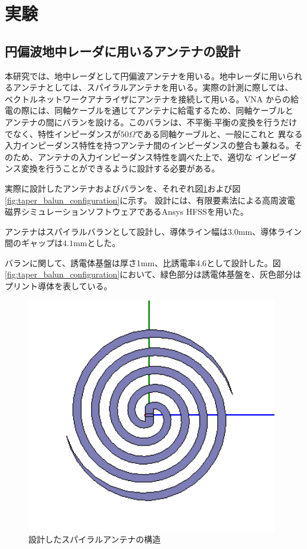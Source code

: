 \documentclass[11pt,a4paper,uplatex,draft]{ujarticle}
\begin{document}
\section{実験}

  \subsection{円偏波地中レーダに用いるアンテナの設計}

  本研究では、地中レーダとして円偏波アンテナを用いる。地中レーダに用いられるアンテナとしては、スパイラルアンテナを用いる。実際の計測に際しては、
  ベクトルネットワークアナライザにアンテナを接続して用いる。VNA からの給電の際には、同軸ケーブルを通じてアンテナに給電するため、同軸ケーブルと
  アンテナの間にバランを設ける。このバランは、不平衡-平衡の変換を行うだけでなく、特性インピーダンスが$50\Omega$である同軸ケーブルと、一般にこれと
  異なる入力インピーダンス特性を持つアンテナ間のインピーダンスの整合も兼ねる。そのため、アンテナの入力インピーダンス特性を調べた上で、適切な
  インピーダンス変換を行うことができるように設計する必要がある。

  実際に設計したアンテナおよびバランを、それぞれ図\ref{fig:spiral_antenna_configuration}および図\ref{fig:taper_balun_configuration}に示す。
  設計には、有限要素法による高周波電磁界シミュレーションソフトウェアであるAnsys HFSSを用いた。

  アンテナはスパイラルバランとして設計し、導体ライン幅は$3.0\mathrm{mm}$、導体ライン間のギャップは$4.1\mathrm{mm}$とした。
  
  バランに関して、誘電体基盤は厚さ1mm、比誘電率4.6として設計した。図\ref{fig:taper_balun_configuration}において、緑色部分は誘電体基盤を、灰色部分は
  プリント導体を表している。

  \begin{figure}[hbtp]
    \centering
    \includegraphics[keepaspectratio, width=110mm]{Images/spiral_antenna_configuration.png}
    \caption{設計したスパイラルアンテナの構造}
    \label{fig:spiral_antenna_configuration}
  \end{figure}
\end{document}
